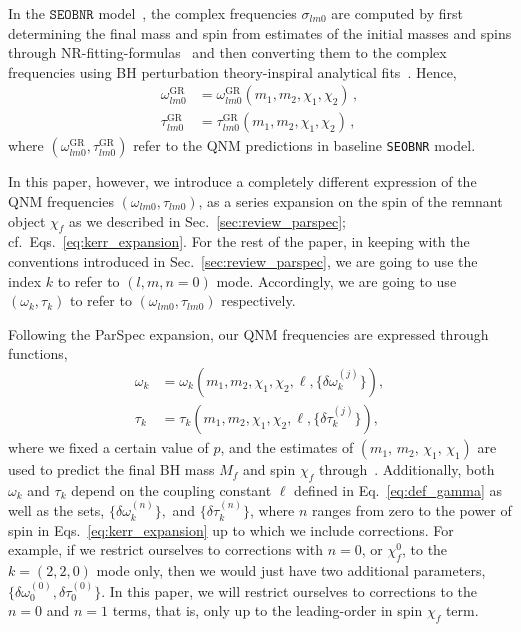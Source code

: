 \documentclass[twocolumn,
               prd,
               aps,
               superscriptaddress,
               tightenlines,
               nofootinbib,
               eqsecnum,
               amsfonts,
               amsmath,
               longbibliography]{revtex4-1}
\newcommand{\SEOB}{\texttt{SEOBNR}}
\begin{document}
In the $\SEOB$ model~\cite{Mihaylov:2021bpf}, the complex frequencies
$\sigma_{l m 0}$ are computed by first determining the final mass and spin from
estimates of the initial masses and spins through NR-fitting-formulas~\cite{Taracchini:2013rva,Hofmann:2016yih}
and then converting them to the complex frequencies using BH perturbation
theory-inspiral analytical fits~\cite{Berti:2005ys,Berti:2009kk}.
%
Hence,
%
\begin{subequations}
\begin{align}
\omega_{l m 0}^{\text{GR}} &= \omega_{l m 0}^{\text{GR}}(m_1, m_2, \chi_1, \chi_2)\,,
\\
\tau _{l m 0}^{\text{GR}} &= \tau _{l m 0}^{\text{GR}}(m_1, m_2, \chi_1, \chi_2)\,,
\end{align}
\end{subequations}
%
where $(\omega_{l m 0}^{\text{GR}}, \tau_{l m 0}^{\text{GR}} )$ refer to the
QNM predictions in baseline \SEOB{} model.

In this paper, however, we introduce a completely different expression of the
QNM frequencies $(\omega_{l m 0}, \tau_{l m 0})$, as a series expansion on the
spin of the remnant object $\chi_f$ as we described in Sec.~\ref{sec:review_parspec}; cf.~Eqs.~\eqref{eq:kerr_expansion}.
%
For the rest of the paper, in keeping with the conventions introduced in
Sec.~\ref{sec:review_parspec}, we are going to use the index $k$ to refer to
$(l, m,n=0)$ mode. Accordingly, we are going to use $(\omega_k, \tau _k)$ to
refer to $(\omega_{l m 0}, \tau _{l m 0})$ respectively.

Following the ParSpec expansion, our QNM frequencies are expressed through functions,
%
\begin{subequations}
\begin{align}
\omega_k &= \omega_k(m_1, m_2, \chi_1, \chi_2,\ell, \{\delta \omega_k^{(j)}\}),\\
\tau_k   &= \tau _k(m_1, m_2, \chi_1, \chi_2, \ell, \{\delta \tau_k^{(j)}\}),
\end{align}
\end{subequations}
%
where we fixed a certain value of $p$, and the estimates of $(m_1,\, m_2,\, \chi_1,\, \chi_1)$ are used to predict
the final BH mass $M_f$ and spin $\chi_f$ through~\cite{Taracchini:2013rva,Hofmann:2016yih}.
%
Additionally, both $\omega_k$ and $\tau_k$ depend on the coupling constant $\ell$
defined in Eq.~\eqref{eq:def_gamma} as well as the sets, $\{\delta
\omega_k^{(n)}\},$ and $\{\delta \tau_k^{(n)}\}$, where $n$ ranges from zero to
the power of spin in Eqs.~\eqref{eq:kerr_expansion} up to which we include
corrections.
%
For example, if we restrict ourselves to corrections with $n=0$, or
$\chi_f^0$, to the $k=(2,2,0)$ mode only, then we would just have two
additional parameters, $\{\delta \omega_0^{(0)}, \delta \tau_0^{(0)}\}$.
%
In this paper, we will restrict ourselves to corrections to the $n=0$ and
$n=1$ terms, that is, only up to the leading-order in spin $\chi_f$ term.
\end{document}
